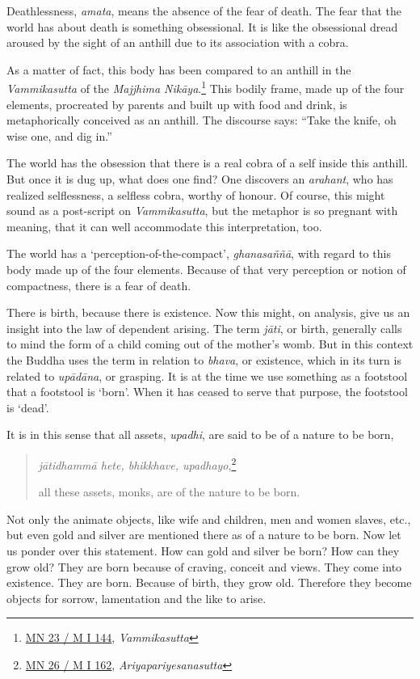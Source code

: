 Deathlessness, \emph{amata}, means the absence of the fear of death. The fear that the world has about death is something obsessional. It is like the obsessional dread aroused by the sight of an anthill due to its association with a cobra.

As a matter of fact, this body has been compared to an anthill in the \emph{Vammikasutta} of the \emph{Majjhima Nikāya}.\footnote{\href{https://suttacentral.net/mn23/pli/ms}{MN 23 / M I 144}, \emph{Vammikasutta}} This bodily frame, made up of the four elements, procreated by parents and built up with food and drink, is metaphorically conceived as an anthill. The discourse says: ``Take the knife, oh wise one, and dig in.''

The world has the obsession that there is a real cobra of a self inside this anthill. But once it is dug up, what does one find? One discovers an \emph{arahant}, who has realized selflessness, a selfless cobra, worthy of honour. Of course, this might sound as a post-script on \emph{Vammikasutta}, but the metaphor is so pregnant with meaning, that it can well accommodate this interpretation, too.

The world has a `perception-of-the-compact', \emph{ghanasaññā}, with regard to this body made up of the four elements. Because of that very perception or notion of compactness, there is a fear of death.

There is birth, because there is existence. Now this might, on analysis, give us an insight into the law of dependent arising. The term \emph{jāti}, or birth, generally calls to mind the form of a child coming out of the mother's womb. But in this context the Buddha uses the term in relation to \emph{bhava}, or existence, which in its turn is related to \emph{upādāna}, or grasping. It is at the time we use something as a footstool that a footstool is `born'. When it has ceased to serve that purpose, the footstool is `dead'.

It is in this sense that all assets, \emph{upadhi}, are said to be of a nature to be born,

\begin{quote}
\emph{jātidhammā hete, bhikkhave, upadhayo},\footnote{\href{https://suttacentral.net/mn26/pli/ms}{MN 26 / M I 162}, \emph{Ariyapariyesanasutta}}

all these assets, monks, are of the nature to be born.
\end{quote}

Not only the animate objects, like wife and children, men and women slaves, etc., but even gold and silver are mentioned there as of a nature to be born. Now let us ponder over this statement. How can gold and silver be born? How can they grow old? They are born because of craving, conceit and views. They come into existence. They are born. Because of birth, they grow old. Therefore they become objects for sorrow, lamentation and the like to arise.

